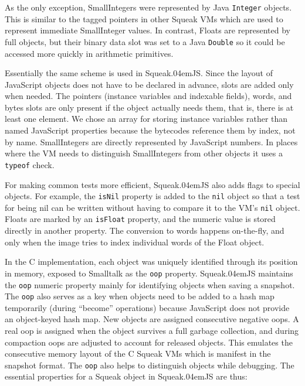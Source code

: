 \documentclass[natbib]{sigplanconf}
\newcommand*\SqueakJS{Squeak\texorpdfstring{\kern.04em}{}JS\xspace}
\newcommand*\JS{JavaScript\xspace}
\begin{document}
As the only exception, SmallIntegers were represented by Java
\lstinline|Integer| objects. This is similar to the tagged pointers in
other Squeak \acp{VM} which are used to represent immediate SmallInteger
values. In contrast, Floats are represented by full objects, but their
binary data slot was set to a Java \lstinline|Double| so it could be
accessed more quickly in arithmetic primitives.

Essentially the same scheme is used in \SqueakJS. Since the layout of \JS
objects does not have to be declared in advance, slots are added only when
needed. The pointers (instance variables and indexable fields), words, and
bytes slots are only present if the object actually needs them, that is, there
is at least one element. We chose an array for storing instance variables
rather than named \JS properties because the bytecodes reference them by
index, not by name. SmallIntegers are directly represented by \JS numbers. In
places where the \ac{VM} needs to distinguish SmallIntegers from other objects it
uses a \lstinline|typeof| check.

For making common tests more efficient, \SqueakJS also adds flags to special
objects. For example, the \lstinline|isNil| property is added to the
\lstinline|nil| object so that a test for being nil can be written without
having to compare it to the \ac{VM}'s \lstinline|nil| object. Floats are marked by
an \lstinline|isFloat| property, and the numeric value is stored directly in
another property. The conversion to words happens on-the-fly, and only when
the image tries to index individual words of the Float object.

In the C implementation, each object was uniquely identified through
its position in memory, exposed to Smalltalk as the \lstinline|oop|
property. \SqueakJS maintains the \lstinline|oop| numeric property
mainly for identifying objects when saving a snapshot. The
\lstinline|oop| also serves as a key when objects need to be added to
a hash map temporarily (\eg during ``become'' operations) because \JS
does not provide an object-keyed hash map. New objects are assigned
consecutive negative oops. A real oop is assigned when the object
survives a full garbage collection, and during compaction oops are
adjusted to account for released objects. This emulates the
consecutive memory layout of the C Squeak \acp{VM} which is manifest in the
snapshot format. The \lstinline|oop| also helps to distinguish objects
while debugging. The essential properties for a Squeak object in
\SqueakJS are thus:
\end{document}
